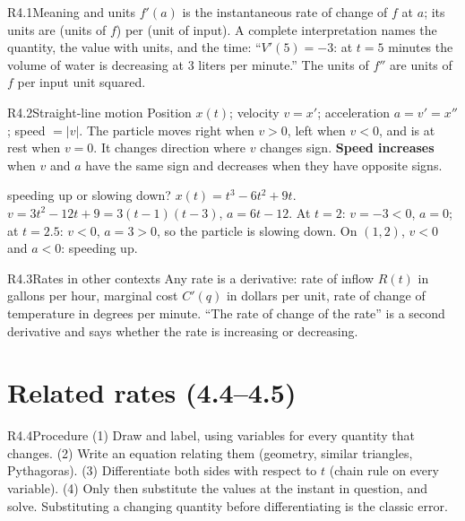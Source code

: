 \documentclass{apcalc}
\begin{document}
\begin{rulebox}{R4.1}{Meaning and units}
$f'(a)$ is the instantaneous rate of change of $f$ at $a$; its units are (units of $f$) per (unit of input). A complete interpretation names the quantity, the value with units, and the time: ``$V'(5)=-3$: at $t=5$ minutes the volume of water is decreasing at 3 liters per minute.'' The units of $f''$ are units of $f$ per input unit squared.
\end{rulebox}

\begin{rulebox}{R4.2}{Straight-line motion}
Position $x(t)$; velocity $v=x'$; acceleration $a=v'=x''$; speed $=|v|$. The particle moves right when $v>0$, left when $v<0$, and is at rest when $v=0$. It changes direction where $v$ changes sign. \textbf{Speed increases} when $v$ and $a$ have the same sign and decreases when they have opposite signs.
\end{rulebox}

\begin{example}{speeding up or slowing down?}
$x(t)=t^3-6t^2+9t$. $v=3t^2-12t+9=3(t-1)(t-3)$, $a=6t-12$. At $t=2$: $v=-3<0$, $a=0$; at $t=2.5$: $v<0$, $a=3>0$, so the particle is slowing down. On $(1,2)$, $v<0$ and $a<0$: speeding up. 
\end{example}

\begin{rulebox}{R4.3}{Rates in other contexts}
Any rate is a derivative: rate of inflow $R(t)$ in gallons per hour, marginal cost $C'(q)$ in dollars per unit, rate of change of temperature in degrees per minute. ``The rate of change of the rate'' is a second derivative and says whether the rate is increasing or decreasing.
\end{rulebox}

\section{Related rates (4.4--4.5)}

\begin{rulebox}{R4.4}{Procedure}
(1) Draw and label, using variables for every quantity that changes. (2) Write an equation relating them (geometry, similar triangles, Pythagoras). (3) Differentiate both sides with respect to $t$ (chain rule on every variable). (4) Only then substitute the values at the instant in question, and solve. Substituting a changing quantity before differentiating is the classic error.
\end{rulebox}
\end{document}
